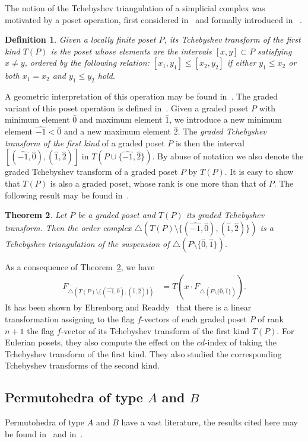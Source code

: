 \documentclass[reqno,12pt]{amsart}
\numberwithin{equation}{section}
\newtheorem{theorem}{Theorem}[section]
\newtheorem{definition}[theorem]{Definition}
\newcommand{\0}{\widehat{0}}
\newcommand{\1}{\widehat{1}}
\newcommand{\2}{\widehat{2}}
\newcommand{\nm}{\widehat{-1}}
\begin{document}
The notion of the Tchebyshev triangulation of a simplicial complex was
motivated by a poset operation, first considered in~\cite{Hetyei-tch}
and formally introduced in~\cite{Hetyei-mfp} .
\begin{definition}
Given a locally finite poset $P$, its {\em Tchebyshev transform of the
  first kind $T(P)$} is
the poset whose elements are the intervals $[x,y]\subset P$ satisfying
$x\neq y$, ordered by the following relation: $[x_1,y_1]\leq [x_2,y_2]$
if either $y_1\leq x_2$ or both $x_1=x_2$ and $y_1\leq y_2$ hold.
\end{definition}
A geometric interpretation of this operation may be found
in~\cite[Theorem 1.10]{Hetyei-mfp}. The graded variant of this poset
operation is defined in~\cite{Ehrenborg-Readdy-Tch}.  
Given a graded  poset $P$ with minimum element $\0$ and maximum element
$\1$, we introduce a new minimum element $\nm<\0$  and a new maximum
element $\2$. The {\em graded Tchebyshev transform of the first kind} of
a graded poset $P$ is then the interval $[(\nm,\0),(\1,\2)]$ in
$T(P\cup\{\nm,\2\})$.  By abuse of notation we also denote the graded
Tchebyshev transform of a graded poset $P$ by $T(P)$. It is easy to show
that $T(P)$ is also a graded poset, whose rank is one more than that of $P$.
The following result may be found in~\cite[Theorem 1.5]{Hetyei-tt}.
\begin{theorem}
\label{thm:tpgraded}
Let $P$ be a graded poset and $T(P)$ its graded Tchebyshev transform.
Then the order complex $\triangle(T(P)\setminus \{(\nm,\0), (\1,\2)\})$
is a Tchebyshev triangulation of the suspension of $\triangle(P\setminus
\{\0,\1\})$. 
\end{theorem}  
As a consequence of Theorem~\ref{thm:tpgraded}, we have
\begin{align}
\label{eq:tposet}  
  F_{\triangle(T(P)\setminus \{(\nm,\0), (\1,\2)\})}
&=T(x\cdot F_{\triangle(P\setminus \{\0,\1\})}). 
\end{align}
It has been shown by Ehrenborg and
Readdy~\cite{Ehrenborg-Readdy-Tch} that there is a linear transformation
assigning to the flag $f$-vectors of each graded poset $P$ of rank $n+1$
the flag $f$-vector of its Tchebyshev transform of the first kind
$T(P)$. For Eulerian posets, they also compute the effect on the
$cd$-index of taking the Tchebyshev transform of the first kind.      
They also studied the corresponding Tchebyshev transforms of the second
kind. 


\subsection{Permutohedra of type $A$ and $B$}
Permutohedra of type $A$ and $B$ have a vast literature, the results
cited here may be found in~\cite{Fomin-Reading} and
in~\cite{Wachs-pt}.  
\end{document}
